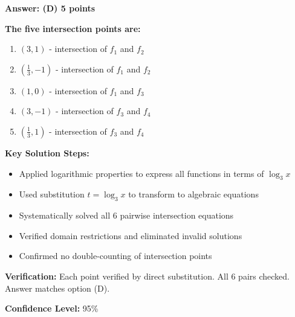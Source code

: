 \documentclass[12pt]{article}
\begin{document}
\begin{tcolorbox}[colback=gray!10!white, colframe=black, title=Final Answer with Justification]
\textbf{Answer: (D) 5 points}

\textbf{The five intersection points are:}
\begin{enumerate}
    \item $(3, 1)$ - intersection of $f_1$ and $f_2$
    \item $(\frac{1}{3}, -1)$ - intersection of $f_1$ and $f_2$
    \item $(1, 0)$ - intersection of $f_1$ and $f_3$
    \item $(3, -1)$ - intersection of $f_3$ and $f_4$
    \item $(\frac{1}{3}, 1)$ - intersection of $f_3$ and $f_4$
\end{enumerate}

\textbf{Key Solution Steps:}
\begin{itemize}
    \item Applied logarithmic properties to express all functions in terms of $\log_3 x$
    \item Used substitution $t = \log_3 x$ to transform to algebraic equations
    \item Systematically solved all 6 pairwise intersection equations
    \item Verified domain restrictions and eliminated invalid solutions
    \item Confirmed no double-counting of intersection points
\end{itemize}

\textbf{Verification:} Each point verified by direct substitution. All 6 pairs checked. Answer matches option (D).

\textbf{Confidence Level:} 95\%
\end{tcolorbox}
\end{document}
